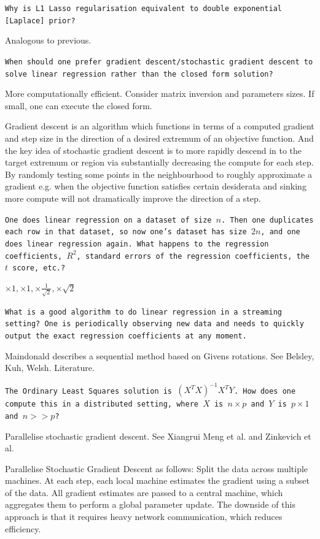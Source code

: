 \texttt{Why is L1 Lasso regularisation equivalent to double exponential [Laplace] prior?}

Analogous to previous.

\texttt{When should one prefer gradient descent/stochastic gradient descent to solve linear regression rather than the closed form solution?}

More computationally efficient. Consider matrix inversion and parameters sizes. If small, one can execute the closed form.

Gradient descent is an algorithm which functions in terms of a computed gradient and step size in the direction of a desired extremum of an objective function. And the key idea of stochastic gradient descent is to more rapidly descend in to the target extremum or region via substantially decreasing the compute for each step. By randomly testing some points in the neighbourhood to roughly approximate a gradient e.g. when the objective function satisfies certain desiderata and sinking more compute will not dramatically improve the direction of a step.

\texttt{One does linear regression on a dataset of size $n$. Then one duplicates each row in that dataset, so now one's dataset has size $2n$, and one does linear regression again. What happens to the regression coefficients, $R^2$, standard errors of the regression coefficients, the $t$ score, etc.?}

$\boxed{\times 1,\times 1,\times \frac{1}{\sqrt{2}},\times \sqrt{2}}$

\texttt{What is a good algorithm to do linear regression in a streaming setting? One is periodically observing new data and needs to quickly output the exact regression coefficients at any moment.}

Maindonald describes a sequential method based on Givens rotations. See Belsley, Kuh, Welsh. Literature.

\texttt{The Ordinary Least Squares solution is $(X^T X)^{-1} X^T Y$. How does one compute this in a distributed setting, where $X$ is $n \times p$ and $Y$ is $p \times 1$ and $n >> p$?}

Parallelise stochastic gradient descent. See Xiangrui Meng et al. and Zinkevich et al.

Parallelise Stochastic Gradient Descent as follows: Split the data across multiple machines. At each step, each local machine estimates the gradient using a subset of the data. All gradient estimates are passed to a central machine, which aggregates them to perform a global parameter update. The downside of this approach is that it requires heavy network communication, which reduces efficiency.

